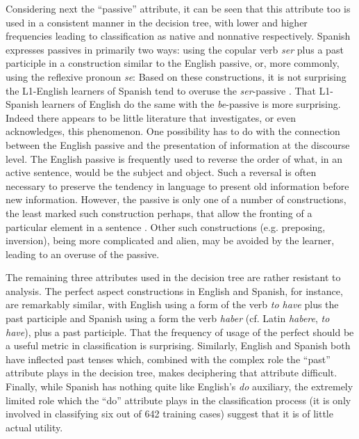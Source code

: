\documentclass[main.tex]{subfiles}
\begin{document}
Considering next the ``passive'' attribute, it can be seen that this attribute too is used in a consistent manner in the decision tree, with lower and higher frequencies leading to classification as native and nonnative respectively. Spanish expresses passives in primarily two ways: using the copular verb \textit{ser} plus a past participle in a construction similar to the English passive, or, more commonly, using the reflexive pronoun \textit{se}:
Based on these constructions, it is not surprising the L1-English learners of Spanish tend to overuse the \textit{ser}-passive \citep[ch. 28.2.3]{butt}. That L1-Spanish learners of English do the same with the \textit{be}-passive is more surprising. Indeed there appears to be little literature that investigates, or even acknowledges, this phenomenon. One possibility has to do with the connection between the English passive and the presentation of information at the discourse level. The English passive is frequently used to reverse the order of what, in an active sentence, would be the subject and object. Such a reversal is often necessary to preserve the tendency in language to present old information before new information. However, the passive is only one of a number of constructions, the least marked such construction perhaps, that allow the fronting of a particular element in a sentence \citep{ward:2008}. Other such constructions (e.g. preposing, inversion), being more complicated and alien, may be avoided by the learner, leading to an overuse of the passive.

The remaining three attributes used in the decision tree are rather resistant to analysis. The perfect aspect constructions in English and Spanish, for instance, are remarkably similar, with English using a form of the verb \textit{to have} plus the past participle and Spanish using a form the verb \textit{haber} (cf. Latin \textit{habere}, \textit{to have}), plus a past participle. That the frequency of usage of the perfect should be a useful metric in classification is surprising. Similarly, English and Spanish both have inflected past tenses which, combined with the complex role the ``past'' attribute plays in the decision tree, makes deciphering that attribute difficult. Finally, while Spanish has nothing quite like English's \textit{do} auxiliary, the extremely limited role which the ``do'' attribute plays in the classification process (it is only involved in classifying six out of 642 training cases) suggest that it is of little actual utility.
\end{document}
